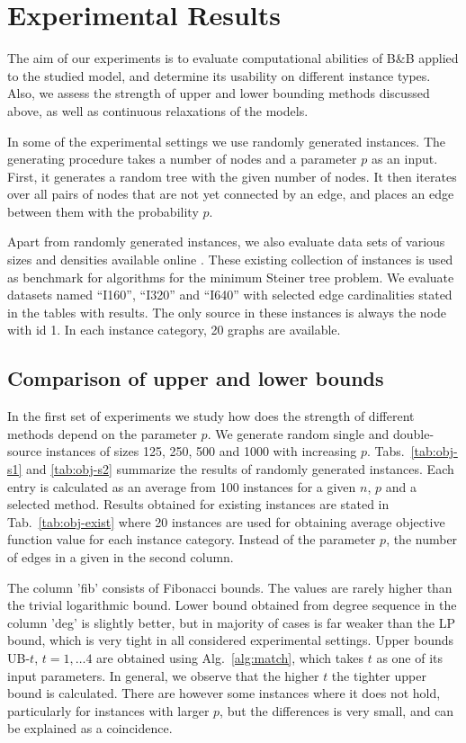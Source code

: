 \section{Experimental Results} \label{sec:exp}

The aim of our experiments is to evaluate computational abilities of B\&B applied to the studied model, and determine its usability on different instance types.
Also, we assess the strength of upper and lower bounding methods discussed above, as well as continuous relaxations of the models.

In some of the experimental settings we use randomly generated instances.
The generating procedure takes a number of nodes and a parameter $p$ as an input.
First, it generates a random tree with the given number of nodes.
It then iterates over all pairs of nodes that are not yet connected by an edge, and places an edge between them with the probability $p$.

Apart from randomly generated instances, we also evaluate data sets of various sizes and densities available online \cite{steinlib}.
These existing collection of instances is used as benchmark for algorithms for the minimum Steiner tree problem.
We evaluate datasets named ``I160'', ``I320'' and ``I640'' with selected edge cardinalities stated in the tables with results.
The only source in these instances is always the node with id 1.
In each instance category, 20 graphs are available.

\subsection{Comparison of upper and lower bounds}

In the first set of experiments we study how does the strength of different methods depend on the parameter $p$.
We generate random single and double-source instances of sizes 125, 250, 500 and 1000 with increasing $p$.
Tabs.~\ref{tab:obj-s1} and \ref{tab:obj-s2} summarize the results of randomly generated instances.
Each entry is calculated as an average from 100 instances for a given $n$, $p$ and a selected method.
Results obtained for existing instances are stated in Tab.~\ref{tab:obj-exist} where 20 instances are used for obtaining average objective function value for each instance category.
Instead of the parameter $p$, the number of edges in a given in the second column.

The column 'fib' consists of Fibonacci bounds.
The values are rarely higher than the trivial logarithmic bound.
Lower bound obtained from degree sequence in the column 'deg' is slightly better, 
but in majority of cases is far weaker than the LP bound, which is very tight in all considered experimental settings.
Upper bounds UB-$t$, $t=1,\dots 4$ are obtained using Alg.~\ref{alg:match}, which takes $t$ as one of its input parameters.
In general, we observe that the higher $t$ the tighter upper bound is calculated.
There are however some instances where it does not hold, particularly for instances with larger $p$,  but the differences is very small, and can be explained as a coincidence.

